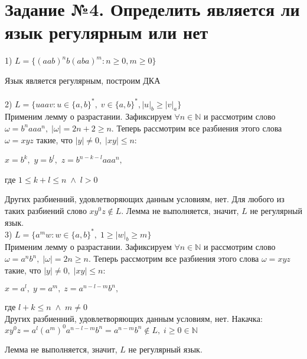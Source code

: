 \documentclass[a4paper,12pt]{article}
\begin{document}
\section{ Задание №4. Определить является ли язык регулярным или нет}

1) $ L=\{(aab)^{n}b(aba)^{m} : n \geqslant 0, m \geqslant 0\} $

Язык является регулярным, построим ДКА \\

 \\

2) $ L = \{uaav : u \in \{a, b\}^*, \; v \in \{a, b\}^*, |u|_b \geqslant |v|_a\} $ \\

Применим лемму о разрастании. 
Зафиксируем $\forall n \in \mathbb{N} $ 
и рассмотрим слово $\omega = b^{n}aaa^{n}, \; |\omega| = 2n + 2 \geq n$. Теперь рассмотрим все разбиения этого слова $\omega = xyz$ такие, что $|y| \neq 0, \; |xy| \leq n$:

$x = b^{k}, $
$y = b^{l}, $ 
$z = b^{n - k - l}aaa^n,$

где $1 \leq k + l \leq n \; \wedge \; l > 0$

Других разбиенний, удовлетворяющих данным условиям, нет.
Для любого из таких разбиений слово $xy^0z \notin L$. 
Лемма не выполняется, значит, $L$ не регулярный язык. \\



3) $L = \{a^mw : w \in \{a, b\}^{*}, \; 1 \geqslant |w|_b \geqslant m\}$ \\

Применим лемму о разрастании. 
Зафиксируем $\forall n \in \mathbb{N} $ 
и рассмотрим слово $\omega = a^nb^n, \; |\omega| = 2n \geqslant n$. 
Теперь рассмотрим все разбиения этого слова $\omega = xyz$ такие, что $|y| \neq 0, \; |xy| \leq n$:

$x = a^{l}, \; y = a^{m}, \; z = a^{n-l-m}b^{n},$ 

где $l + k \leqslant n \; \wedge \; m \ne 0$ \\

Других разбиенний, удовлетворяющих данным условиям, нет. 
Накачка: \\

$ xy^{0}z = a^{l}(a^{m})^{0}a^{n-l-m}b^{n} = a^{n-m}b^{n} \notin L, \; i 
\geqslant 0 \in \mathbb{N} $

Лемма не выполняется, значит, $L$ не регулярный язык. \\
\end{document}
